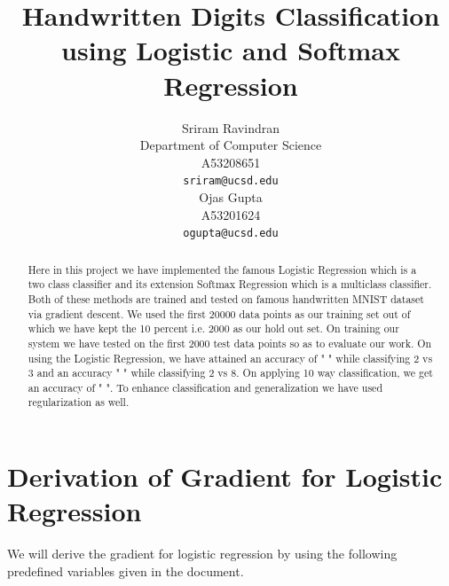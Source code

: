 \documentclass{article} %
\title{Handwritten Digits Classification using Logistic and Softmax Regression}
\author{
Sriram Ravindran\\
Department of Computer Science\\
A53208651 \\
\texttt{sriram@ucsd.edu} \\
\And
Ojas Gupta \\
A53201624 \\
\texttt{ogupta@ucsd.edu} \\
}
\begin{document}
\maketitle
\begin{abstract}
Here in this project we have implemented the famous Logistic Regression which is a two class classifier and its extension Softmax Regression which is a multiclass classifier. Both of these methods are trained and tested on famous handwritten MNIST dataset via gradient descent. We used the first 20000 data points as our training set out of which we have kept the 10 percent i.e. 2000 as our hold out set. On training our system we have tested on the first 2000 test data points so as to evaluate our work. On using the Logistic Regression, we have attained an accuracy of " " while classifying 2 vs 3 and an accuracy " " while classifying 2 vs 8. On applying 10 way classification, we get an accuracy of " ". To enhance classification and generalization we have used regularization as well. 
\end{abstract}

\section{Derivation of Gradient for Logistic Regression}
We will derive the gradient for logistic regression by using the following predefined variables given in the document.
\end{document}
